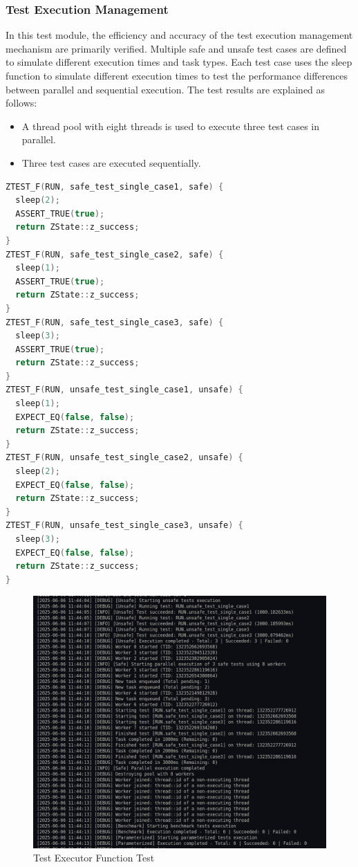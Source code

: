 \documentclass{article}
\begin{document}
\subsubsection{Test Execution Management}
In this test module, the efficiency and accuracy of the test execution management mechanism are primarily verified. Multiple safe and unsafe test cases are defined to simulate different execution times and task types. Each test case uses the sleep function to simulate different execution times to test the performance differences between parallel and sequential execution.
The test results are explained as follows:
\begin{itemize}
    \item A thread pool with eight threads is used to execute three test cases in parallel.
    \item Three test cases are executed sequentially.
\end{itemize}
\begin{framed}
    \begin{lstlisting}[language=C++]
ZTEST_F(RUN, safe_test_single_case1, safe) {
  sleep(2);
  ASSERT_TRUE(true);
  return ZState::z_success;
}
ZTEST_F(RUN, safe_test_single_case2, safe) {
  sleep(1);
  ASSERT_TRUE(true);
  return ZState::z_success;
}
ZTEST_F(RUN, safe_test_single_case3, safe) {
  sleep(3);
  ASSERT_TRUE(true);
  return ZState::z_success;
}
ZTEST_F(RUN, unsafe_test_single_case1, unsafe) {
  sleep(1);
  EXPECT_EQ(false, false);
  return ZState::z_success;
}
ZTEST_F(RUN, unsafe_test_single_case2, unsafe) {
  sleep(2);
  EXPECT_EQ(false, false);
  return ZState::z_success;
}
ZTEST_F(RUN, unsafe_test_single_case3, unsafe) {
  sleep(3);
  EXPECT_EQ(false, false);
  return ZState::z_success;
}
\end{lstlisting}
\end{framed}
\begin{figure}[H]
    \centering
    \includegraphics[width=\textwidth]{img/context.png}
    \caption{Test Executor Function Test}
    \label{fig:test executor function test}
\end{figure}
\end{document}
